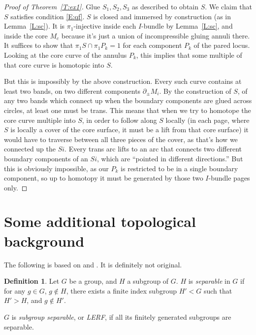 \documentclass[12pt]{amsart}
\theoremstyle{definition}
\newtheorem{defn}[theorem]{Definition}
\theoremstyle{remark}
\newcommand{\bd}{\partial}
\begin{document}
\begin{proof}[Proof of Theorem~\ref{T:ex1}]
Glue $S_1,S_2,S_3$ as described to obtain $S$. We claim that $S$ satisfies
condition \eqref{E:qf}. $S$ is closed and immersed by construction (as in
Lemma~\ref{L:sc}). It is $\pi_1$-injective inside each $I$-bundle by
Lemma~\ref{L:sc}, and inside the core $M_c$ because it's just a union of
incompressible gluing annuli there. It suffices to show that $\pi_1S \cap
\pi_1P_k = 1$ for each component $P_k$ of the pared locus. Looking at the core
curve of the annulus $P_k$, this implies that some multiple of that core curve
is homotopic into $S$.

But this is impossibly by the above construction. Every such curve contains at
least two bands, on two different components $\bd_\pm M_i$. By the construction
of $S$, of any two bands which connect up when the boundary components are
glued across circles, at least one must be trans. This means that when we try
to homotope the core curve multiple into $S$, in order to follow along $S$
locally (in each page, where $S$ is locally a cover of the core surface, it
must be a lift from that core surface) it would have to traverse between all
three pieces of the cover, as that's how we connected up the $Si$. Every trans
arc lifts to an arc that connects two different boundary components of an $Si$,
which are ``pointed in different directions.'' But this is obviously
impossible, as our $P_k$ is restricted to be in a single boundary component, so
up to homotopy it must be generated by those two $I$-bundle pages only.

\end{proof}

\section{Some additional topological background}

The following is based on \cite{AFW} and \cite{LR}. It is definitely not
original.

\begin{defn}

Let $G$ be a group, and $H$ a subgroup of $G$. $H$ is \emph{separable} in $G$
if for any $g \in G$, $g \notin H$, there exists a finite index subgroup $H'<G$
such that $H'>H$, and $g \notin H'$.

$G$ is \emph{subgroup separable}, or \emph{LERF}, if all its finitely generated
subgroups are separable.

\end{defn}
\end{document}
